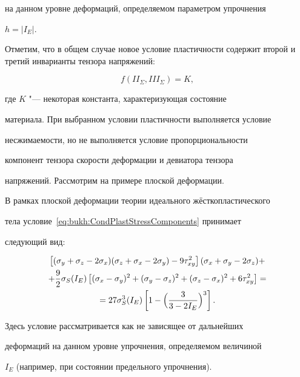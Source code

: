 на данном уровне деформаций, определяемом параметром упрочнения

$h=|I_E|$.



Отметим, что в общем случае новое условие пластичности содержит второй и третий инварианты тензора напряжений:

$$

f\left(II_\Sigma,III_\Sigma\right)=K,

$$

где $K$ "--- некоторая константа, характеризующая состояние

материала. При выбранном условии пластичности выполняется условие

несжимаемости, но не выполняется условие пропорциональности

компонент тензора скорости деформации и девиатора тензора

напряжений. Рассмотрим на примере плоской деформации.



\smallskip




В рамках плоской деформации теории идеального жёсткопластического

тела условие~\eqref{eq:bukh:CondPlastStressComponents} принимает

следующий вид:

\begin{multline}\label{eq:bukh:CondPlastPlaneStrain}

\left[(\sigma_y+\sigma_z-2\sigma_x)(\sigma_z+\sigma_x-2\sigma_y)-9\tau_{xy}^2\right](\sigma_x+\sigma_y-2\sigma_z)+ \\

+\frac{9}{2}\sigma_S(I_E)\left[(\sigma_x-\sigma_y)^2+(\sigma_y-\sigma_z)^2+(\sigma_z-\sigma_x)^2+6\tau_{xy}^2\right]=\\

=27\sigma_S^3(I_E)\left[1-\Bigl(\frac{3}{3-2I_E}\Bigr)^3\right].

\end{multline}

Здесь условие рассматривается как не зависящее от дальнейших

деформаций на данном уровне упрочнения, определяемом величиной

$I_E$ (например, при состоянии предельного упрочнения).



